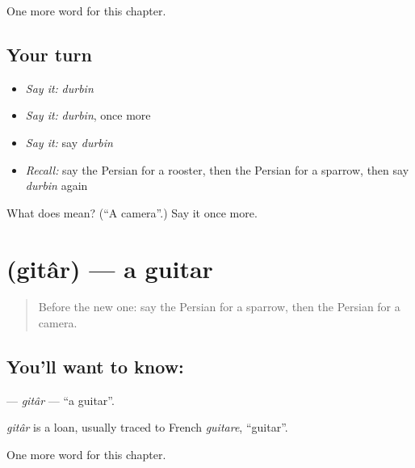 \begin{grammarlens}[title={What you've built}]
One more word for this chapter.
\end{grammarlens}

\subsection*{Your turn}
\begin{itemize}
\raggedright
  \item \emph{Say it:} \emph{durbin}
  \item \emph{Say it:} \emph{durbin}, once more
  \item \emph{Say it:} say \emph{durbin}
  \item \emph{Recall:} say the Persian for a rooster, then the Persian for a sparrow, then say \emph{durbin} again
\end{itemize}

\begin{tcolorbox}[breakable,colback=teal!4,colframe=teal!35!black,title={Before you move on}]
What does  mean? (\textquotedblleft{}A camera\textquotedblright{}.) Say it once more.
\end{tcolorbox}
\section[\texorpdfstring{\fa{گیتار} (gitâr)}{گیتار (gitâr)}]{ (gitâr) — a guitar}

\label{lesson:FA-C172-gitar}



\begin{quote}
Before the new one: say the Persian for a sparrow, then the Persian for a camera.
\end{quote}

\subsection*{You'll want to know: }
\textbf{} — \emph{gitâr} — \textquotedblleft{}a guitar\textquotedblright{}.

\begin{cousinweb}
\emph{gitâr} is a loan, usually traced to French \emph{guitare}, \textquotedblleft{}guitar\textquotedblright{}.
\end{cousinweb}

\begin{grammarlens}[title={What you've built}]
One more word for this chapter.
\end{grammarlens}

